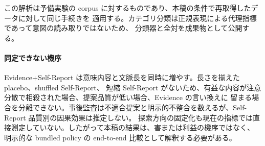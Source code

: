 \documentclass[conference,letterpaper]{IEEEtran}
\begin{document}
この解析は予備実験の corpus に対するものであり、本稿の条件で再取得したデータに対して同じ手続きを
適用する。カテゴリ分類は正規表現による代理指標であって意図の読み取りではないため、
分類器と全対を成果物として公開する。

\paragraph{同定できない機序}
Evidence+Self-Report は意味内容と文脈長を同時に増やす。長さを揃えた placebo、shuffled Self-Report、
短縮 Self-Report がないため、有益な内容が注意分散で相殺された場合、提案品質が低い場合、Evidence の言い換えに
留まる場合を分離できない。事後監査は不適合提案と明示的不整合を数えるが、Self-Report 品質別の因果効果は推定しない。
探索方向の固定化も現在の指標では直接測定していない。したがって本稿の結果は、害または利益の機序ではなく、
明示的な bundled policy の end-to-end 比較として解釈する必要がある。

\end{document}
